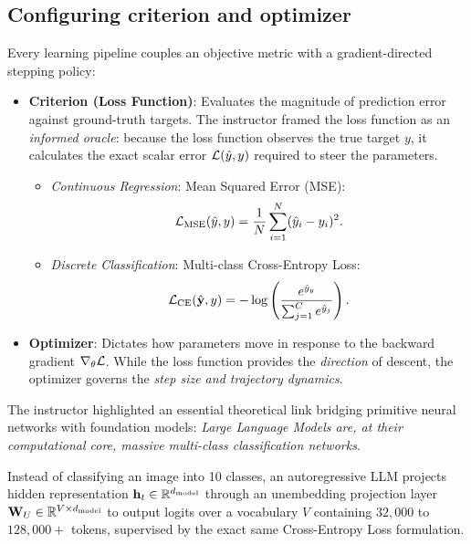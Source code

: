 \documentclass[../labs.tex]{subfiles}
\begin{document}
\subsection{Configuring criterion and optimizer}
Every learning pipeline couples an objective metric with a gradient-directed stepping policy:
\begin{itemize}
    \item \textbf{Criterion (Loss Function)}: Evaluates the magnitude of prediction error against ground-truth targets. The instructor framed the loss function as an \emph{informed oracle}: because the loss function observes the true target $y$, it calculates the exact scalar error $\mathcal{L}(\hat{y}, y)$ required to steer the parameters.
    \begin{itemize}
        \item \emph{Continuous Regression}: Mean Squared Error (MSE):
        \begin{equation}
        \mathcal{L}_{\text{MSE}}(\hat{y}, y) = \frac{1}{N} \sum_{i=1}^N (\hat{y}_i - y_i)^2.
        \end{equation}
        \item \emph{Discrete Classification}: Multi-class Cross-Entropy Loss:
        \begin{equation}
        \mathcal{L}_{\text{CE}}(\hat{\mathbf{y}}, y) = -\log\left(\frac{e^{\hat{y}_y}}{\sum_{j=1}^C e^{\hat{y}_j}}\right).
        \end{equation}
    \end{itemize}
    \item \textbf{Optimizer}: Dictates how parameters move in response to the backward gradient $\nabla_\theta \mathcal{L}$. While the loss function provides the \emph{direction} of descent, the optimizer governs the \emph{step size and trajectory dynamics}.
\end{itemize}

\begin{examinsight}
The instructor highlighted an essential theoretical link bridging primitive neural networks with foundation models: \emph{Large Language Models are, at their computational core, massive multi-class classification networks}. 

Instead of classifying an image into 10 classes, an autoregressive LLM projects hidden representation $\mathbf{h}_t \in \mathbb{R}^{d_{\text{model}}}$ through an unembedding projection layer $\mathbf{W}_U \in \mathbb{R}^{V \times d_{\text{model}}}$ to output logits over a vocabulary $V$ containing $32{,}000$ to $128{,}000+$ tokens, supervised by the exact same Cross-Entropy Loss formulation.
\end{examinsight}
\end{document}
